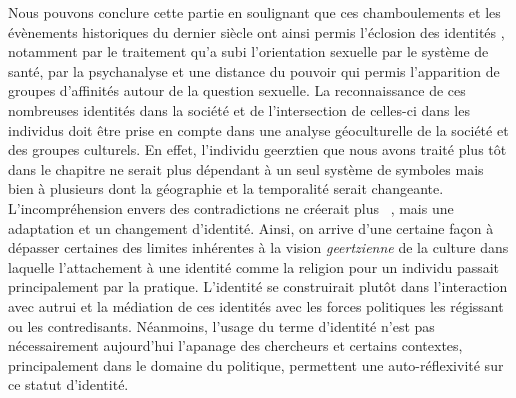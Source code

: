 Nous pouvons conclure cette partie en soulignant que ces chamboulements et les évènements historiques du dernier siècle ont ainsi permis l'éclosion des identités \lgbt{}, notamment par le traitement qu'a subi l'orientation sexuelle par le système de santé, par la psychanalyse et une distance du pouvoir qui permis l'apparition de groupes d'affinités autour de la question sexuelle. 
La reconnaissance de ces nombreuses identités dans la société et de l'intersection de celles-ci dans les individus doit être prise en compte dans une analyse géoculturelle de la société et des groupes culturels.
En effet, l'individu geerztien que nous avons traité plus tôt dans le chapitre ne serait plus dépendant à un seul système de symboles mais bien à plusieurs dont la géographie et la temporalité serait changeante.
L'incompréhension envers des contradictions ne créerait plus ~\citep[33]{Geertz1972}, mais une adaptation et un changement d'identité.
Ainsi, on arrive d'une certaine façon à dépasser certaines des limites inhérentes à la vision \emph{geertzienne} de la culture dans laquelle l'attachement à une identité comme la religion pour un individu passait principalement par la pratique.
L'identité se construirait plutôt dans l'interaction avec autrui et la médiation de ces identités avec les forces politiques les régissant ou les contredisants.
Néanmoins, l'usage du terme d'identité n'est pas nécessairement aujourd'hui l'apanage des chercheurs et certains contextes, principalement dans le domaine du politique, permettent une auto-réflexivité sur ce statut d'identité.


